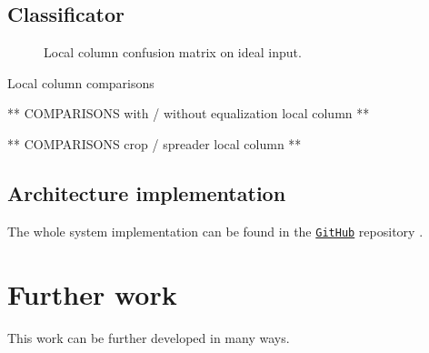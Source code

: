     \subsection{Classificator}
    \par{

    }
    \begin{figure}
        \centering
        \caption{Local column confusion matrix on ideal input.}\label{fig:local-confusion}
    \end{figure}
    \begin{table}
        \centering
        \normalsize
        \caption{Local column comparisons}\label{table:results:local-comparisons}
    \end{table}
    \par{
        ** COMPARISONS with / without equalization local column **
    }
    \par{
        ** COMPARISONS crop / spreader local column **
    }
    \subsection{Architecture implementation}
    \par{
        The whole system implementation can be found in the \href{https://github.com/antonioterpin/wavelet_ml}{\texttt{GitHub}} repository \cite{antonioterpin:github}.
    }

\section{Further work}\label{section:further-work}
    \par{
        This work can be further developed in many ways.
    }
